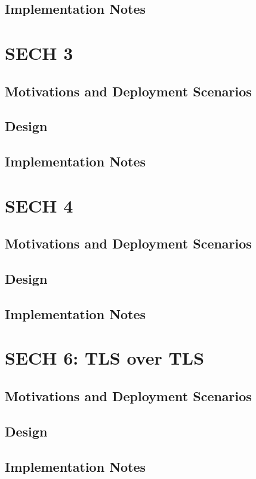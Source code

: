 \subsection{Implementation Notes}




\section{SECH 3}
\subsection{Motivations and Deployment Scenarios}
\subsection{Design}
\subsection{Implementation Notes}
\section{SECH 4}
\subsection{Motivations and Deployment Scenarios}
\subsection{Design}
\subsection{Implementation Notes}



\section{SECH 6: TLS over TLS}
\subsection{Motivations and Deployment Scenarios}
\subsection{Design}
\subsection{Implementation Notes}


